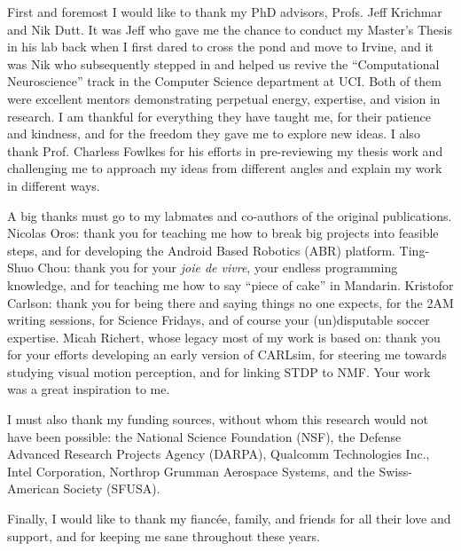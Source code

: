 \acknowledgments
{
	First and foremost I would like to thank my PhD advisors, Profs.
    Jeff Krichmar and Nik Dutt.
    It was Jeff who gave me the chance to conduct my Master's Thesis in his lab
    back when I first dared to cross the pond and move to Irvine,
    and it was Nik who subsequently stepped
    in and helped us revive the ``Computational Neuroscience'' track in the
    Computer Science department at UCI.
    Both of them were excellent mentors demonstrating perpetual energy, 
    expertise, and vision in research.
    I am thankful for everything they have taught me,
    for their patience and kindness,
    and for the freedom they gave me to explore new ideas.
    I also thank Prof. Charless Fowlkes for his efforts in pre-reviewing my
    thesis work and challenging me to approach my ideas from different angles
    and explain my work in different ways.
    
    A big thanks must go to my labmates and co-authors of the original publications.
    Nicolas Oros: thank you for teaching me how to break big projects into
    feasible steps, and for developing the Android Based Robotics (ABR) platform.
    Ting-Shuo Chou: thank you for your \emph{joie de vivre}, 
    your endless programming knowledge, 
    and for teaching me how to say ``piece of cake'' in Mandarin.
    Kristofor Carlson: thank you for being there and saying things no one expects,
    for the 2AM writing sessions, for Science Fridays, 
    and of course your (un)disputable soccer expertise.
    Micah Richert, whose legacy most of my work is based on: thank you for your
    efforts developing an early version of CARLsim,
    for steering me towards studying visual motion perception,
    and for linking STDP to NMF. Your work was a great inspiration to me.
    
    I must also thank my funding sources, without whom this research would not
    have been possible: the National Science Foundation (NSF),
    the Defense Advanced Research Projects Agency (DARPA),
    Qualcomm Technologies Inc., Intel Corporation, 
    Northrop Grumman Aerospace Systems,
    and the Swiss-American Society (SFUSA).
    
    Finally, I would like to thank my fianc\'{e}e, family, and friends 
    for all their love and support,
    and for keeping me sane throughout these years.
}


\newcommand{\mypubentry}[3]{
  \begin{tabular*}{1\textwidth}{@{\extracolsep{\fill}}p{4.5in}r}
    \textbf{#1} & \textbf{#2} \\ 
    \multicolumn{2}{@{\extracolsep{\fill}}p{.95\textwidth}}{#3}\vspace{6pt} \\
  \end{tabular*}
}
\newcommand{\mysoftentry}[3]{
  \begin{tabular*}{1\textwidth}{@{\extracolsep{\fill}}lr}
    \textbf{#1} & \url{#2} \\
    \multicolumn{2}{@{\extracolsep{\fill}}p{.95\textwidth}}
    {\emph{#3}}\vspace{-6pt} \\
  \end{tabular*}
}

